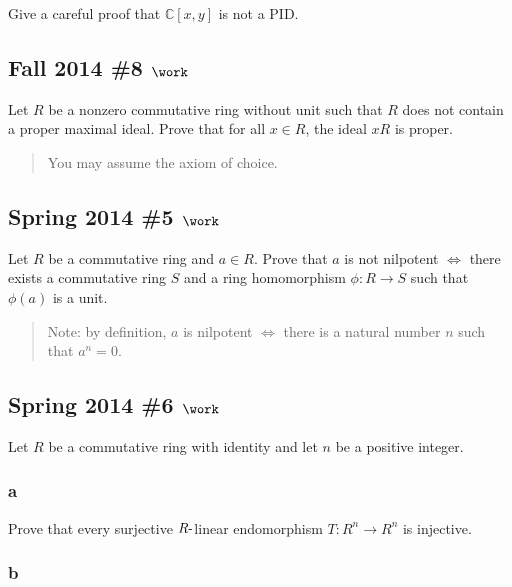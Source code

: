Give a careful proof that \({\mathbb{C}}[x, y]\) is not a PID.

\hypertarget{fall-2014-8-work}{%
\subsection{\texorpdfstring{Fall 2014 \#8
\(\work\)}{Fall 2014 \#8 \textbackslash work}}\label{fall-2014-8-work}}

Let \(R\) be a nonzero commutative ring without unit such that \(R\)
does not contain a proper maximal ideal. Prove that for all \(x\in R\),
the ideal \(xR\) is proper.

\begin{quote}
You may assume the axiom of choice.
\end{quote}

\hypertarget{spring-2014-5-work}{%
\subsection{\texorpdfstring{Spring 2014 \#5
\(\work\)}{Spring 2014 \#5 \textbackslash work}}\label{spring-2014-5-work}}

Let \(R\) be a commutative ring and \(a\in R\). Prove that \(a\) is not
nilpotent \(\iff\) there exists a commutative ring \(S\) and a ring
homomorphism \(\phi: R\to S\) such that \(\phi(a)\) is a unit.

\begin{quote}
Note: by definition, \(a\) is nilpotent \(\iff\) there is a natural
number \(n\) such that \(a^n = 0\).
\end{quote}

\hypertarget{spring-2014-6-work}{%
\subsection{\texorpdfstring{Spring 2014 \#6
\(\work\)}{Spring 2014 \#6 \textbackslash work}}\label{spring-2014-6-work}}

Let \(R\) be a commutative ring with identity and let \(n\) be a
positive integer.

\hypertarget{a-45}{%
\subsubsection{a}\label{a-45}}

Prove that every surjective \(R{\hbox{-}}\)linear endomorphism
\(T: R^n \to R^n\) is injective.

\hypertarget{b-35}{%
\subsubsection{b}\label{b-35}}

